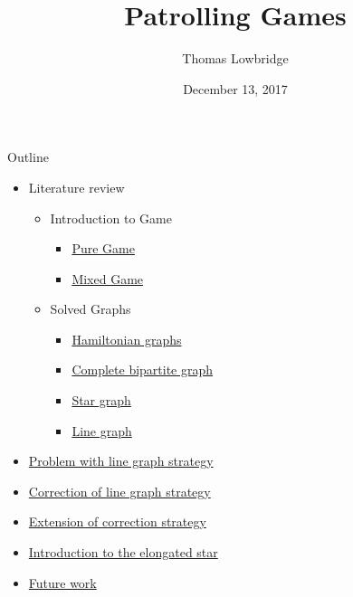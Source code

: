 \documentclass[11pt]{beamer}
\author{Thomas Lowbridge}
\title{Patrolling Games}
\institute{University Of Nottingham}
\date{December 13, 2017}
\begin{document}
\begin{frame}
\titlepage
\end{frame}


\begin{frame}{Outline}

\begin{itemize}
\item Literature review
 \begin{itemize}
 \item Introduction to Game
  \begin{itemize}
  \item \hyperlink{Introduction to Game: Pure Game}{Pure Game}
  \item \hyperlink{Introduction to Game: Mixed Game}{Mixed Game}
  \end{itemize}
 \item Solved Graphs
  \begin{itemize}
  \item \hyperlink{Solved Graphs: Hamiltonian graphs}{Hamiltonian graphs}
  \item \hyperlink{Solved Graphs: Complete bipartite graphs}{Complete bipartite graph}
  \item \hyperlink{Solved Graphs: Star graph}{Star graph}
  \item \hyperlink{Solved Graphs: Line graph}{Line graph}
  \end{itemize}   
 \end{itemize}
\item \hyperlink{Problem with line graph strategy}{Problem with line graph strategy}
\item \hyperlink{Correction of line graph strategy}{Correction of line graph strategy}
\item \hyperlink{Extension of correction strategy}{Extension of correction strategy}
\item \hyperlink{Introduction to the elongated star}{Introduction to the elongated star}
\item \hyperlink{Future work}{Future work}
\end{itemize}
\end{frame}
\end{document}
